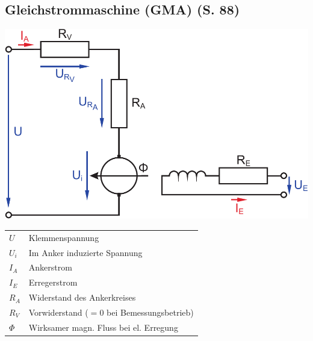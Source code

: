 \documentclass[a4paper,twocolumn,10pt]{article}
\begin{document}
\subsection{Gleichstrommaschine (GMA) (S. 88)}
\begin{center}
\includegraphics[width=0.95\columnwidth]{Grafiken/Gleichstrommaschine}
\end{center}
\begin{tabular}{ll}
$U$ & Klemmenspannung\\
$U_i$ & Im Anker induzierte Spannung\\
$I_A$ & Ankerstrom\\
$I_E$ & Erregerstrom\\
$R_A$ & Widerstand des Ankerkreises\\
$R_V$ & Vorwiderstand ($=0$ bei Bemessungsbetrieb)\\
$\Phi$ & Wirksamer magn. Fluss bei el. Erregung
\end{tabular}
\end{document}
